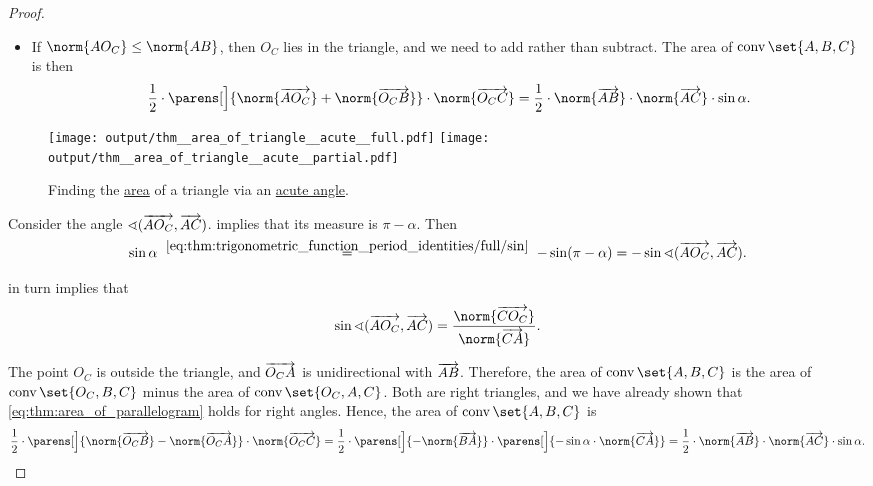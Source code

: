 \begin{proof}
\begin{itemize}
    \item If \( \norm{A O_C} \leq \norm{A B} \), then \( O_C \) lies in the triangle, and we need to add rather than subtract. The area of \( \conv\set{ A, B, C } \) is then
    \begin{equation*}
      \frac 1 2 \cdot \parens[\Big]{ \norm{\vect{A O_C}} + \norm{\vect{O_C B}} } \cdot \norm{\vect{O_C C}} = \frac 1 2 \cdot \norm{\vect{AB}} \cdot \norm{\vect{AC}} \cdot \sin \alpha.
    \end{equation*}
  \end{itemize}

  \begin{figure}[!ht]
    \hfill
    \hfill
    \texttt{[image: output/thm\_\_area\_of\_triangle\_\_acute\_\_full.pdf]}
    \hfill
    \texttt{[image: output/thm\_\_area\_of\_triangle\_\_acute\_\_partial.pdf]}
    \hfill
    \caption{Finding the \hyperref[def:figure_area]{area} of a triangle via an \hyperref[def:angle/measure/acute]{acute angle}.}\label{fig:thm:area_of_triangle/measure/acute}
  \end{figure}

   Consider the angle \( \sphericalangle(\overrightarrow{A O_C}, \overrightarrow{A C}) \).  implies that its measure is \( \pi - \alpha \). Then
  \begin{equation*}
    \sin \alpha
    \reloset {\eqref{eq:thm:trigonometric_function_period_identities/full/sin}} =
    -\sin(\pi - \alpha)
    =
    -\sin \sphericalangle(\vect{A O_C}, \vect{A C}).
  \end{equation*}

   in turn implies that
  \begin{equation*}
    \sin \sphericalangle(\vect{A O_C}, \vect{A C})
    =
    \frac {\norm{\vect{C O_C}}} {\norm{\vect{CA}}}.
  \end{equation*}

  The point \( O_C \) is outside the triangle, and \( \overrightarrow{O_C A} \) is unidirectional with \( \overrightarrow{AB} \). Therefore, the area of \( \conv\set{ A, B, C } \) is the area of \( \conv\set{ O_C, B, C } \) minus the area of \( \conv\set{ O_C, A, C } \). Both are right triangles, and we have already shown that \eqref{eq:thm:area_of_parallelogram} holds for right angles. Hence, the area of \( \conv\set{ A, B, C } \) is
  \begin{equation*}
    \frac 1 2 \cdot \parens[\Big]{ \norm{\vect{O_C B}} - \norm{\vect{O_C A}} } \cdot \norm{\vect{O_C C}}
    =
    \frac 1 2 \cdot \parens[\Big]{ -\norm{\vect{B A}} } \cdot \parens[\Big]{ -\sin \alpha \cdot \norm{\vect{CA}} }
    =
    \frac 1 2 \cdot \norm{\vect{AB}} \cdot \norm{\vect{AC}} \cdot \sin \alpha.
  \end{equation*}


\end{proof}
